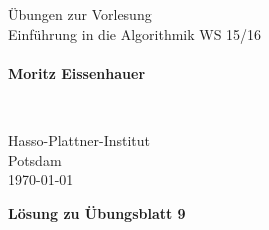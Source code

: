 \documentclass{scrartcl}
\begin{document}
\pagestyle{plain}


\noindent
\begin{minipage}{0.66\textwidth}
Übungen zur Vorlesung\\
Einführung in die Algorithmik WS 15/16\\
~\\
\textbf{Moritz Eissenhauer}
\end{minipage}
~
\begin{minipage}{0.30\textwidth}
Hasso-Plattner-Institut\\
Potsdam\\
\today
\end{minipage}


\begin{center}
 \huge \bf Lösung zu Übungsblatt 9
\end{center}
\end{document}
